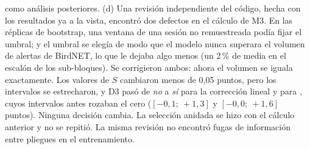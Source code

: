 \begin{enumerate}
        como análisis posteriores.
        (d) Una revisión independiente del código, hecha con los resultados ya a la vista, encontró dos defectos en el cálculo de M3. En las réplicas de
        bootstrap, una ventana de una sesión no remuestreada podía fijar el umbral; y el umbral se elegía de modo que el modelo nunca superara el volumen
        de alertas de BirdNET, lo que le dejaba algo menos (un 2\,\% de media en el escalón de los sub-bloques). Se corrigieron ambos: ahora el
        volumen se iguala exactamente. Los valores de $S$ cambiaron menos de 0,05 puntos, pero los intervalos se estrecharon, y D3 pasó de \emph{no} a
        \emph{sí} para la corrección lineal y para , cuyos intervalos antes rozaban el cero ($[-0{,}1;\ +1{,}3]$ y $[-0{,}0;\ +1{,}6]$ puntos).
        Ninguna decisión cambia. La selección anidada se hizo con el cálculo anterior y no se repitió. La misma revisión no encontró fugas de
        información entre pliegues en el entrenamiento.
\end{enumerate}
